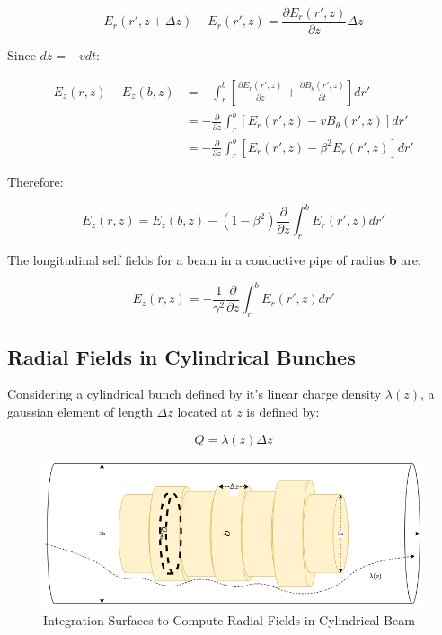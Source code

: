 $$E_r(r', z+\Delta z)-E_r(r', z) = \frac{\partial E_r(r', z)}{\partial z}\Delta z$$

Since $dz = -vdt$:

$$\begin{aligned}
        E_z(r,z)-E_z(b,z) & = -\int_r^b\left[\frac{\partial E_r(r', z)}{\partial z}+\frac{\partial B_{\theta}(r', z)}{\partial t}\right]dr' \\
                          & =-\frac{\partial}{\partial z}\int_r^b[E_r(r',z)-vB_{\theta}(r',z)]dr'                                           \\
                          & =-\frac{\partial}{\partial z}\int_r^b[E_r(r',z)-\beta^2E_r(r',z)]dr'
    \end{aligned}$$

Therefore:

$$E_z(r,z) = E_z(b,z)-(1-\beta^2)\frac{\partial}{\partial z}\int_r^bE_r(r',z)dr'$$

The longitudinal self fields  for a beam in a conductive pipe of radius \textbf{b} are:

$$\boxed{E_z(r, z) = -\frac{1}{\gamma^2}\frac{\partial}{\partial z}\int_r^bE_r(r', z)dr'}$$

\subsection{Radial Fields in Cylindrical Bunches}

Considering a cylindrical bunch defined by it's linear charge density $\lambda(z)$, a gaussian element of length $\Delta z$ located at $z$ is defined by:

$$Q = \lambda(z) \Delta z$$

\begin{figure}
    \centering
    \includegraphics{./figs/gaussian_cylindrical_bunch.png}
    \caption{Integration Surfaces to Compute Radial Fields in Cylindrical Beam}

\end{figure}

